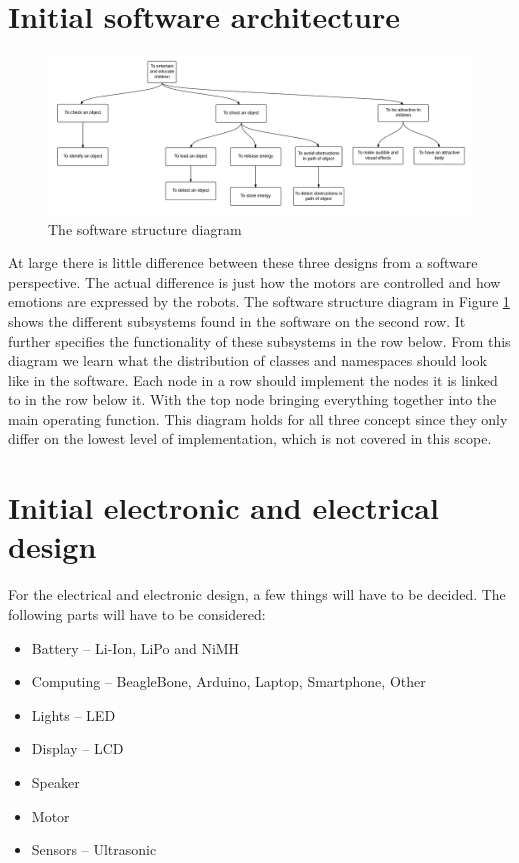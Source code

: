 \documentclass[11pt,twoside,a4paper]{report}
\begin{document}
\section{Initial software architecture}
\begin{figure}
  \begin{center}
    \includegraphics[width=16cm]{Images/FunctionalAnalysis.png}
  \end{center}
  \caption{The software structure diagram}
  \label{figure:softdiag}
\end{figure}
At large there is little difference between these three designs from a software perspective. The actual difference is just how the motors are controlled and how emotions are expressed by the robots. 
The software structure diagram in Figure \ref{figure:softdiag} shows the different subsystems found in the software on the second row. It further specifies the functionality of these subsystems in the row below. From this diagram we learn what the distribution of classes and namespaces should look like in the software. Each node in a row should implement the nodes it is linked to in the row below it. With the top node bringing everything together into the main operating function. This diagram holds for all three concept since they only differ on the lowest level of implementation, which is not covered in this scope.

\section{Initial electronic and electrical design}
For the electrical and electronic design, a few things will have to be decided. The following parts will have to be considered: 
\begin{itemize}
\item Battery -- Li-Ion, LiPo and NiMH
\item Computing -- BeagleBone, Arduino, Laptop, Smartphone, Other
\item Lights -- LED
\item Display -- LCD
\item Speaker
\item Motor
\item Sensors -- Ultrasonic
\end{itemize}
\end{document}
